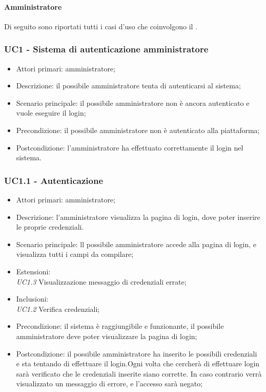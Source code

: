 ﻿\paragraph{Amministratore}
Di seguito sono riportati tutti i casi d'uso che coinvolgono il  .


\subsubsection{UC1 - Sistema di autenticazione amministratore}

\begin{itemize}
\item Attori primari: amministratore;
\item Descrizione: il possibile amministratore tenta di autenticarsi al sistema;
\item Scenario principale: il possibile amministratore non è ancora autenticato e vuole eseguire il login;
\item Precondizione: il possibile amministratore non è autenticato alla piattaforma;
\item Postcondizione: l'amministratore ha effettuato correttamente il login nel sistema.

\end{itemize}

\subsubsection{UC1.1 - Autenticazione}

\begin{itemize}
\item Attori primari: amministratore;
\item Descrizione: l'amministratore visualizza la pagina di login, dove poter inserire le proprie credenziali. 
\item Scenario principale: ll possibile amministratore accede alla pagina di login, e visualizza tutti i campi da compilare;
\item Estensioni: \\\emph{UC1.3} Visualizzazione messaggio di credenziali errate;
\item Inclusioni: \\\emph{UC1.2} Verifica credenziali;
\item Precondizione: il sistema è raggiungibile e funzionante, il possibile amministratore deve poter visualizzare la pagina di login;
\item Postcondizione: il possibile amministratore ha inserito le possibili credenziali e sta tentando di effettuare il login.Ogni volta che cercherà di effettuare
login sarà verificato che le credenziali inserite siano corrette. In caso contrario verrà visualizzato un messaggio di errore, e l'accesso sarà negato;

\end{itemize}


